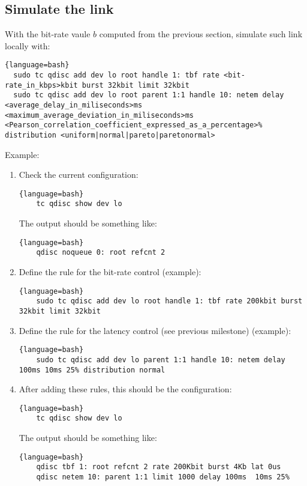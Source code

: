 \subsection{Simulate the link}

With the bit-rate vaule $b$ computed from the previous section, simulate
such link locally with:

\begin{lstlisting}{language=bash}
  sudo tc qdisc add dev lo root handle 1: tbf rate <bit-rate_in_kbps>kbit burst 32kbit limit 32kbit
  sudo tc qdisc add dev lo root parent 1:1 handle 10: netem delay <average_delay_in_miliseconds>ms <maximum_average_deviation_in_miliseconds>ms <Pearson_correlation_coefficient_expressed_as_a_percentage>% distribution <uniform|normal|pareto|paretonormal>
\end{lstlisting}

Example:

\begin{enumerate}
\item Check the current configuration:
  
  \begin{lstlisting}{language=bash}
    tc qdisc show dev lo
  \end{lstlisting}
  
  The output should be something like:
  
  \begin{lstlisting}{language=bash}
    qdisc noqueue 0: root refcnt 2
  \end{lstlisting}
  
\item Define the rule for the bit-rate control (example):
  
  \begin{lstlisting}{language=bash}
    sudo tc qdisc add dev lo root handle 1: tbf rate 200kbit burst 32kbit limit 32kbit
  \end{lstlisting}
  
\item Define the rule for the latency control (see previous milestone) (example):
  
  \begin{lstlisting}{language=bash}
    sudo tc qdisc add dev lo parent 1:1 handle 10: netem delay 100ms 10ms 25% distribution normal
  \end{lstlisting}
  
\item After adding these rules, this should be the configuration:
  
  \begin{lstlisting}{language=bash}
    tc qdisc show dev lo
  \end{lstlisting}
  
  The output should be something like:
  
  \begin{lstlisting}{language=bash}
    qdisc tbf 1: root refcnt 2 rate 200Kbit burst 4Kb lat 0us 
    qdisc netem 10: parent 1:1 limit 1000 delay 100ms  10ms 25%
  \end{lstlisting}

\end{enumerate}

